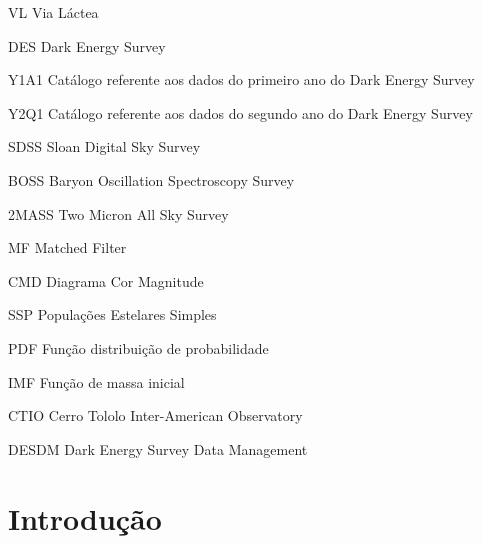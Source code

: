 \documentclass[
	12pt,				%
	openany,			%
	oneside,			%
	a4paper,			%
	english,			%
	brazil				%
	]{abntex2}
\begin{document}

\begin{siglas}
  \item[VL] Via Láctea
  \item[DES] Dark Energy Survey
  \item[Y1A1] Catálogo referente aos dados do primeiro ano do Dark Energy Survey
  \item[Y2Q1] Catálogo referente aos dados do segundo ano do Dark Energy Survey
  \item[SDSS] Sloan Digital Sky Survey
  \item[BOSS] Baryon Oscillation Spectroscopy Survey 
  \item[2MASS] Two Micron All Sky Survey
  \item[MF] Matched Filter
  \item[CMD] Diagrama Cor Magnitude
  \item[SSP] Populações Estelares Simples
  \item[PDF] Função distribuição de probabilidade
  \item[IMF] Função de massa inicial
  \item[CTIO] Cerro Tololo Inter-American Observatory
  \item[DESDM] Dark Energy Survey Data Management

\end{siglas}


\tableofcontents*
\cleardoublepage



\textual

\chapter*[Introdução]{Introdução}
\end{document}
